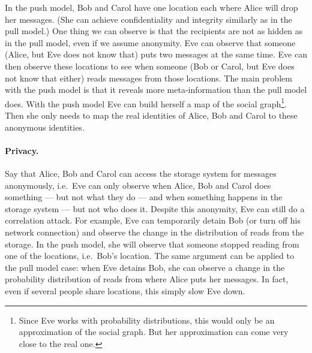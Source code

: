In the push model, Bob and Carol have one location each where Alice will drop 
her messages.
(She can achieve confidentiality and integrity similarly as in the pull model.)
One thing we can observe is that the recipients are not as hidden as in the 
pull model, even if we assume anonymity.
Eve can observe that someone (Alice, but Eve does not know that) puts two 
messages at the same time.
Eve can then observe these locations to see when someone (Bob or Carol, but Eve
does not know that either) reads messages from those locations.
The main problem with the push model is that it reveals more meta-information 
than the pull model does.
With the push model Eve can build herself a map of the social graph\footnote{%
  Since Eve works with probability distributions, this would only be an 
  approximation of the social graph.
  But her approximation can come very close to the real one.
}.
Then she only needs to map the real identities of Alice, Bob and Carol to these 
anonymous identities.

\paragraph{Privacy.}

%
Say that Alice, Bob and Carol can access the storage system for messages 
anonymously, i.e.\ Eve can only observe when Alice, Bob and Carol does 
something --- but not what they do --- and when something happens in the 
storage system --- but not who does it.
Despite this anonymity, Eve can still do a correlation attack.
For example, Eve can temporarily detain Bob (or turn off his network 
connection) and observe the change in the distribution of reads from the 
storage.
In the push model, she will observe that someone stopped reading from one of 
the locations, i.e.\ Bob's location.
The same argument can be applied to the pull model case: when Eve detains Bob, 
she can observe a change in the probability distribution of reads from where 
Alice puts her messages.
In fact, even if several people share locations, this simply slow Eve down.


